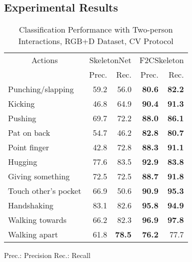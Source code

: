 \documentclass{bmvc2k}
\begin{document}
\subsection{Experimental Results}
\begin{table}[t]
\footnotesize 
	\begin{minipage}{0.55\textwidth}
	\centering
	\caption{Classification Performance with Two-person Interactions, RGB+D Dataset, CV Protocol}
	\label{tab:table3}
	\hspace*{-1cm}
		\begin{tabular}{|l@{\hspace{0.5\tabcolsep}}|r@{\hspace{0.5\tabcolsep}}|@{\hspace{0.5\tabcolsep}} r|r@{\hspace{0.5\tabcolsep}}|@{\hspace{0.5\tabcolsep}} r|}
		\hline
		\multicolumn{1}{|c|}{Actions} & \multicolumn{2}{c|}{SkeletonNet} & \multicolumn{2}{c|}{F2CSkeleton} \\
		{}& Prec. & Rec. & Prec. & Rec. \\
		\hline
		Punching/slapping & 59.2 & 56.0 & \textbf{80.6} & \textbf{82.2}\\
		Kicking& 46.8 & 64.9 & \textbf{90.4} & \textbf{91.3}\\
		Pushing & 69.7 & 72.2 & \textbf{88.0} & \textbf{86.1}\\
		Pat on back& 54.7 & 46.2 & \textbf{82.8} & \textbf{80.7}\\
		Point finger& 42.8 & 72.8 & \textbf{88.3} & \textbf{91.1}\\
		Hugging& 77.6 & 83.5 & \textbf{92.9} & \textbf{83.8}\\
		Giving something & 72.5 & 72.5 & \textbf{88.7} & \textbf{91.8}\\
		Touch other's pocket & 66.9 & 50.6 & \textbf{90.9} & \textbf{95.3}\\
		Handshaking& 83.1 & 82.6 & \textbf{95.8} & \textbf{94.9}\\
		Walking towards& 66.2 & 82.3 & \textbf{96.9} & \textbf{97.8}\\
		Walking apart& 61.8 & \textbf{78.5} & \textbf{76.2} & 77.7\\
		\hline
		\end{tabular}
	\hspace*{-1cm}
	\begin{tablenotes}
		\footnotesize
		\item * Prec.: Precision \hspace{0.5cm}  Rec.: Recall\\

\end{tablenotes}
\end{minipage}
\end{table}
\end{document}
